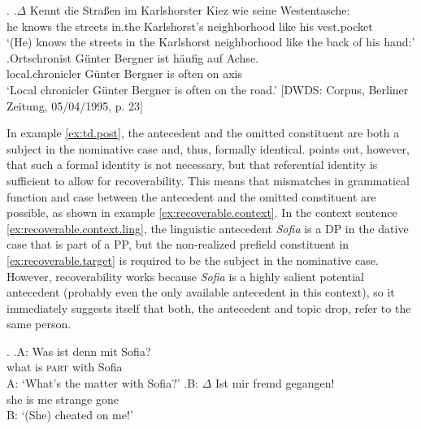 \ex.\label{ex:td.post}
\ag.\label{ex:td.post.td}$\Delta$ Kennt die Straßen im Karlshorster Kiez wie seine Westentasche:\\
he knows the streets in.the Karlshorst's neighborhood like his vest.pocket\\
`(He) knows the streets in the Karlshorst neighborhood like the back of his hand:'
\bg.\label{ex:td.post.ff}Ortschronist Günter Bergner ist häufig auf Achse.\\
local.chronicler Günter Bergner is often on axis\\
`Local chronicler Günter Bergner is often on the road.' [DWDS: Corpus, Berliner Zeitung, 05/04/1995, p. 23] \citep[22]{trutkowski2016}

In example \ref{ex:td.post}, the antecedent and the omitted constituent are both a subject in the nominative case and, thus, formally identical.
\citet[27]{fries1988}  points out, however, that such a formal identity is not necessary, but that referential identity is sufficient to allow for recoverability. 
This means that mismatches in grammatical function and case between the antecedent and the omitted constituent are possible, as shown in example \ref{ex:recoverable.context}.
In the context sentence \ref{ex:recoverable.context.ling}, the linguistic antecedent \textit{Sofia} is a DP in the dative case that is part of a PP, but the non-realized prefield constituent in \ref{ex:recoverable.target} is required to be the subject in the nominative case.
However, recoverability works because \textit{Sofia} is a highly salient  potential antecedent (probably even the only available antecedent in this context), so it immediately suggests itself that both, the antecedent and topic drop, refer to the same person.

\ex.\label{ex:recoverable.context}
\ag.\label{ex:recoverable.context.ling}A: Was ist denn mit Sofia?\\
{} what is \textsc{part} with Sofia\\
A: `What's the matter with Sofia?'
\bg.\label{ex:recoverable.target}B: $\Delta$ Ist mir fremd gegangen!\\
{} she is me strange gone\\
B: `(She) cheated on me!' \citep[20]{fries1988}

